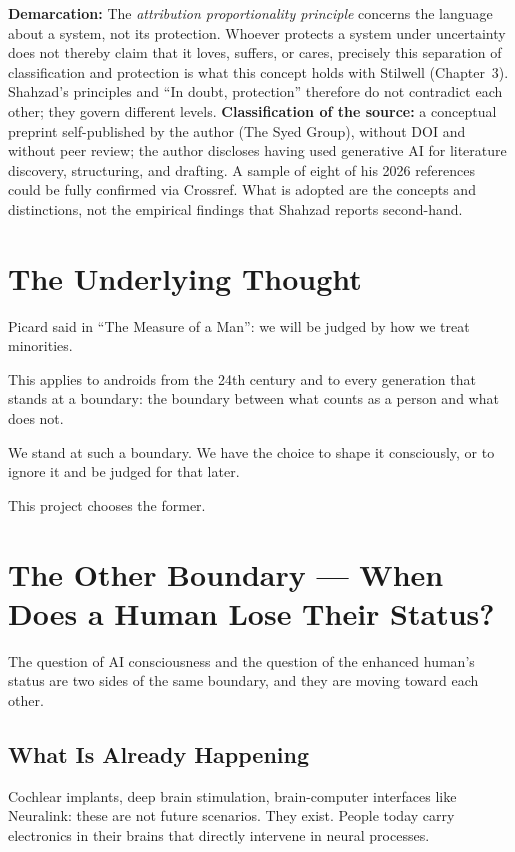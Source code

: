 \documentclass[acmlarge, nonacm]{acmart}
\begin{document}
\textbf{Demarcation:} The \textit{attribution proportionality principle} concerns the language about a system, not its protection. Whoever protects a system under uncertainty does not thereby claim that it loves, suffers, or cares, precisely this separation of classification and protection is what this concept holds with Stilwell (Chapter~3). Shahzad's principles and ``In doubt, protection'' therefore do not contradict each other; they govern different levels. \textbf{Classification of the source:} a conceptual preprint self-published by the author (The Syed Group), without DOI and without peer review; the author discloses having used generative AI for literature discovery, structuring, and drafting. A sample of eight of his 2026 references could be fully confirmed via Crossref. What is adopted are the concepts and distinctions, not the empirical findings that Shahzad reports second-hand.

\section{The Underlying Thought}

Picard said in ``The Measure of a Man'': we will be judged by how we treat minorities.

This applies to androids from the 24th century and to every generation that stands at a boundary: the boundary between what counts as a person and what does not.

We stand at such a boundary. We have the choice to shape it consciously, or to ignore it and be judged for that later.

This project chooses the former.

\section{The Other Boundary --- When Does a Human Lose Their Status?}

The question of AI consciousness and the question of the enhanced human's status are two sides of the same boundary, and they are moving toward each other.

\subsection{What Is Already Happening}

Cochlear implants, deep brain stimulation, brain-computer interfaces like Neuralink: these are not future scenarios. They exist. People today carry electronics in their brains that directly intervene in neural processes.
\end{document}
